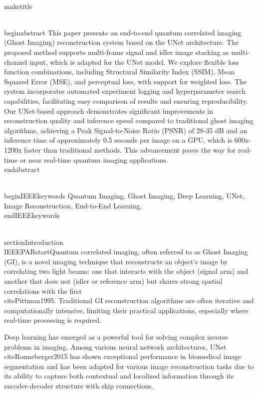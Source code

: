 \documentclass[10pt,journal]{IEEEtran} %
\begin{document}
\\maketitle

\\begin{abstract}
This paper presents an end-to-end quantum correlated imaging (Ghost Imaging) reconstruction system based on the UNet architecture. The proposed method supports multi-frame signal and idler image stacking as multi-channel input, which is adapted for the UNet model. We explore flexible loss function combinations, including Structural Similarity Index (SSIM), Mean Squared Error (MSE), and perceptual loss, with support for weighted loss. The system incorporates automated experiment logging and hyperparameter search capabilities, facilitating easy comparison of results and ensuring reproducibility. Our UNet-based approach demonstrates significant improvements in reconstruction quality and inference speed compared to traditional ghost imaging algorithms, achieving a Peak Signal-to-Noise Ratio (PSNR) of 28-35 dB and an inference time of approximately 0.5 seconds per image on a GPU, which is 600x-1200x faster than traditional methods. This advancement paves the way for real-time or near real-time quantum imaging applications.
\\end{abstract}

\\begin{IEEEkeywords} %
Quantum Imaging, Ghost Imaging, Deep Learning, UNet, Image Reconstruction, End-to-End Learning.
\\end{IEEEkeywords}

\\section{Introduction}
\\IEEEPARstart{Quantum} correlated imaging, often referred to as Ghost Imaging (GI), is a novel imaging technique that reconstructs an object's image by correlating two light beams: one that interacts with the object (signal arm) and another that does not (idler or reference arm) but shares strong spatial correlations with the first \\cite{Pittman1995}. Traditional GI reconstruction algorithms are often iterative and computationally intensive, limiting their practical applications, especially where real-time processing is required.

Deep learning has emerged as a powerful tool for solving complex inverse problems in imaging. Among various neural network architectures, UNet \\cite{Ronneberger2015} has shown exceptional performance in biomedical image segmentation and has been adapted for various image reconstruction tasks due to its ability to capture both contextual and localized information through its encoder-decoder structure with skip connections.
\end{document}
